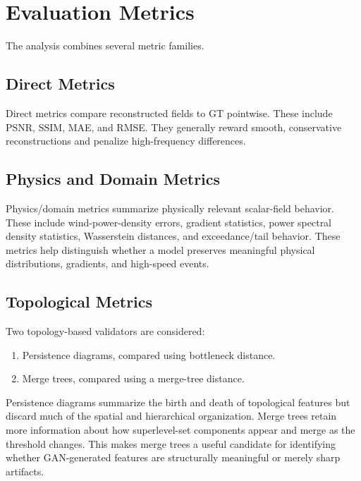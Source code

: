 \documentclass[10pt,conference]{IEEEtran}
\begin{document}

\section{Evaluation Metrics}

The analysis combines several metric families.

\subsection{Direct Metrics}
Direct metrics compare reconstructed fields to GT pointwise. These include PSNR,
SSIM, MAE, and RMSE. They generally reward smooth, conservative reconstructions and
penalize high-frequency differences.

\subsection{Physics and Domain Metrics}
Physics/domain metrics summarize physically relevant scalar-field behavior. These
include wind-power-density errors, gradient statistics, power spectral density
statistics, Wasserstein distances, and exceedance/tail behavior. These metrics help
distinguish whether a model preserves meaningful physical distributions, gradients,
and high-speed events.

\subsection{Topological Metrics}
Two topology-based validators are considered:
\begin{enumerate}[leftmargin=*]
    \item Persistence diagrams, compared using bottleneck distance.
    \item Merge trees, compared using a merge-tree distance.
\end{enumerate}

Persistence diagrams summarize the birth and death of topological features but
discard much of the spatial and hierarchical organization. Merge trees retain more
information about how superlevel-set components appear and merge as the threshold
changes. This makes merge trees a useful candidate for identifying whether
GAN-generated features are structurally meaningful or merely sharp artifacts.

\end{document}

